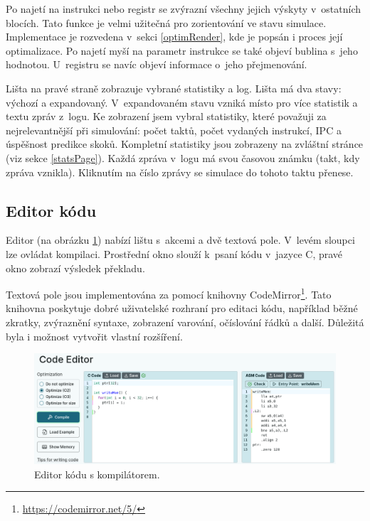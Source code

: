 Po najetí na instrukci nebo registr se zvýrazní všechny jejich výskyty v~ostatních blocích.
Tato funkce je velmi užitečná pro zorientování ve stavu simulace. 
Implementace je rozvedena v~sekci \ref{optimRender}, kde je popsán i proces její optimalizace.
Po najetí myší na parametr instrukce se také objeví bublina s~jeho hodnotou.
U~registru se navíc objeví informace o~jeho přejmenování. 

Lišta na pravé straně zobrazuje vybrané statistiky a log.
Lišta má dva stavy: výchozí a expandovaný.
V~expandovaném stavu vzniká místo pro více statistik a textu zpráv z~logu.
Ke zobrazení jsem vybral statistiky, které považuji za nejrelevantnější při simulování: počet taktů, počet vydaných instrukcí, IPC a úspěšnost predikce skoků.
Kompletní statistiky jsou zobrazeny na zvláštní stránce (viz sekce \ref{statsPage}).
Každá zpráva v~logu má svou časovou známku (takt, kdy zpráva vznikla).
Kliknutím na číslo zprávy se simulace do tohoto taktu přenese.


\subsection{Editor kódu}
\label{codeEditorPage}

Editor (na obrázku \ref{codeeditor_figure}) nabízí lištu s~akcemi a dvě textová pole.
V~levém sloupci lze ovládat kompilaci.
Prostřední okno slouží k~psaní kódu v~jazyce C, pravé okno zobrazí výsledek překladu.

Textová pole jsou implementována za pomocí knihovny CodeMirror\footnote{\url{https://codemirror.net/5/}}.
Tato knihovna poskytuje dobré uživatelské rozhraní pro editaci kódu, například běžné zkratky, zvýraznění syntaxe, zobrazení varování, očíslování řádků a další.
Důležitá byla i možnost vytvořit vlastní rozšíření.

\begin{figure}[hbtp]
    \begin{center}
        \includegraphics[width=15cm]{obrazky-figures/impl/codeeditor.png}
    \end{center}
    \caption{Editor kódu s kompilátorem.}
    \label{codeeditor_figure}
\end{figure}

